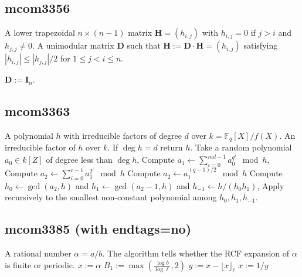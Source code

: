 \documentclass{amsart}
\begin{document}
\subsection{mcom3356}

	\begin{algorithmic}[1]
		\REQUIRE A lower trapezoidal $n\times (n-1)$ matrix $\mathbf{H}=(h_{i,j})$ with $h_{i,j}=0$ if $j>i$ and $h_{j,j}\ne 0$.
		\ENSURE A unimodular matrix $\mathbf D$ such that $\mathbf H:=\mathbf D\cdot \mathbf H = (h_{i,j})$ satisfying  $|h_{i,j}|\le |h_{j,j}|/2$ for $1\le j<i\le n$.

		\STATE $\mathbf{D} := \mathbf{I}_n$.
		\ENDFOR
		\ENDFOR
		\ENDFOR
	\end{algorithmic}

\subsection{mcom3363}

	\begin{algorithmic}[1]
		\REQUIRE A polynomial $h$  with irreducible factors of degree $d$ over $k=\mathbb{F}_q[X]/f(X)$.
		\ENSURE An irreducible factor of $h$ over $k$.
		\STATE If $\deg h = d$ return $h$.
		\STATE Take a random polynomial $a_0\in k[Z]$ of degree less than $\deg h$,
		\STATE\label{alg:ks-pseudotrace} Compute $a_1
		\leftarrow \sum_{i=0}^{md-1} a_0^{q^i} \mod h$,
		\STATE\label{alg:ks:even} Compute $a_2 \leftarrow
		\sum_{i=0}^{e-1} a_1^{2^i}\mod h$
		\ELSE
		\STATE\label{alg:ks:odd} Compute $a_2 \leftarrow a_1^{(q-1)/2}\mod h$
		\ENDIF
		\STATE\label{alg:ks:gcd} Compute $h_0\leftarrow\gcd(a_2,h)$ and
		$h_1\leftarrow\gcd(a_2-1,h)$ and $h_{-1}\leftarrow h/(h_0h_1)$,
		\STATE Apply recursively to the smallest non-constant polynomial among
		$h_0,h_1,h_{-1}$.
	\end{algorithmic}

\subsection{mcom3385 (with endtags=no)}

\makeatletter
\ALG@noendtrue
\makeatother

  \begin{algorithmic}[1]
    \REQUIRE A rational number $\alpha=a/b$.
    \ENSURE The algorithm tells whether the RCF expansion of $\alpha$ is finite or periodic.
    \STATE $x:=\alpha$
    \STATE $B_1:=\max\left(\frac{\log b}{\log\ell},2\right)$
        \ENDIF
        \STATE $y:=x-\lfloor x\rfloor_\ell$
        \ENDIF
        \STATE $x:=1/y$
    \ENDFOR
   \end{algorithmic}
\end{document}
